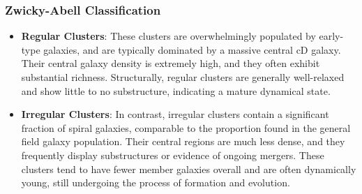 \subsubsection{Zwicky-Abell Classification}

\begin{itemize}
    \item \textbf{Regular Clusters}: These clusters are overwhelmingly populated by early-type galaxies, and are typically dominated by a massive central cD galaxy. Their central galaxy density is extremely high, and they often exhibit substantial richness. Structurally, regular clusters are generally well-relaxed and show little to no substructure, indicating a mature dynamical state.
    \item \textbf{Irregular Clusters}: In contrast, irregular clusters contain a significant fraction of spiral galaxies, comparable to the proportion found in the general field galaxy population. Their central regions are much less dense, and they frequently display substructures or evidence of ongoing mergers. These clusters tend to have fewer member galaxies overall and are often dynamically young, still undergoing the process of formation and evolution.
\end{itemize}

